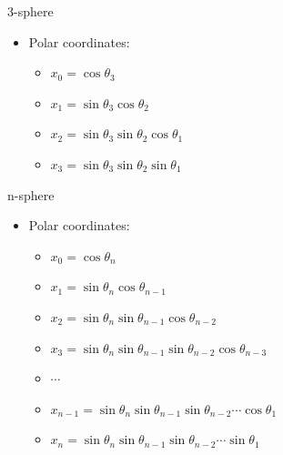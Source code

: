 \begin{frame}{3-sphere}
\protect\hypertarget{sphere}{}

\begin{itemize}
\item
  Polar coordinates:

  \begin{itemize}
  \item
    \(x_0 = \cos\theta_3\)
  \item
    \(x_1 = \sin\theta_3 \cos\theta_2\)
  \item
    \(x_2 = \sin\theta_3 \sin\theta_2 \cos\theta_1\)
  \item
    \(x_3 = \sin\theta_3 \sin\theta_2 \sin\theta_1\)
  \end{itemize}
\end{itemize}

\end{frame}

\begin{frame}{n-sphere}
\protect\hypertarget{n-sphere}{}

\begin{itemize}
\item
  Polar coordinates:

  \begin{itemize}
  \item
    \(x_0 = \cos\theta_n\)
  \item
    \(x_1 = \sin\theta_n \cos\theta_{n-1}\)
  \item
    \(x_2 = \sin\theta_n \sin\theta_{n-1} \cos\theta_{n-2}\)
  \item
    \(x_3 = \sin\theta_n \sin\theta_{n-1} \sin\theta_{n-2} \cos\theta_{n-3}\)
  \item
    \(\cdots\)
  \item
    \(x_{n-1} = \sin\theta_n \sin\theta_{n-1} \sin\theta_{n-2} \cdots \cos\theta_1\)
  \item
    \(x_n = \sin\theta_n \sin\theta_{n-1} \sin\theta_{n-2} \cdots \sin\theta_1\)
  \end{itemize}
\end{itemize}

\end{frame}

